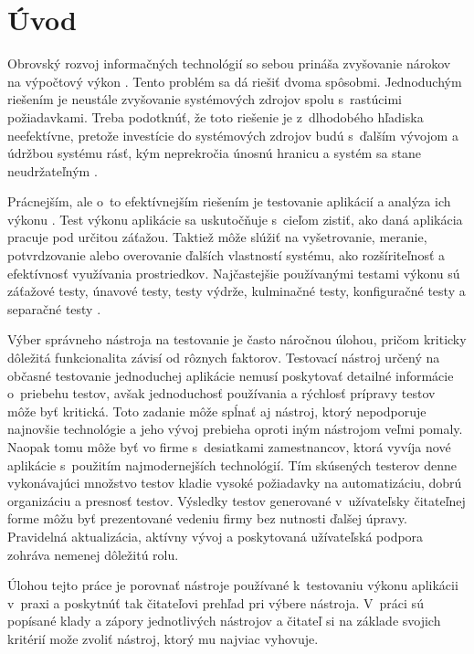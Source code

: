 \documentclass[12pt,oneside,final]{fithesis-utf8}
\begin{document}
\chapter{Úvod}
Obrovský rozvoj informačných technológií so sebou prináša zvyšovanie nárokov na
výpočtový výkon \cite{ComputingPower}. Tento problém sa dá riešiť dvoma spôsobmi. Jednoduchým riešením 
je neustále zvyšovanie systémových zdrojov spolu s~rastúcimi požiadavkami. Treba 
podotknúť, že toto riešenie je z~dlhodobého hľadiska neefektívne, pretože investície do 
systémových zdrojov budú s~ďalším vývojom a údržbou systému rásť, kým neprekročia 
únosnú hranicu a systém sa stane neudržateľným \cite{Sochor}.
\par Prácnejším, ale o~to efektívnejším 
riešením je testovanie aplikácií a analýza ich výkonu \cite{Art}. Test výkonu aplikácie sa 
uskutočňuje s~cieľom zistiť, ako daná aplikácia pracuje pod určitou záťažou. Taktiež môže 
slúžiť na vyšetrovanie, meranie, potvrdzovanie alebo overovanie ďalších vlastností systému, 
ako rozšíriteľnosť a efektívnosť využívania prostriedkov. Najčastejšie používanými testami 
výkonu sú záťažové testy, únavové testy, testy výdrže, kulminačné testy, konfiguračné testy a separačné testy \cite{Art}.
\par
Výber správneho nástroja na testovanie je často náročnou úlohou, pričom kriticky dôležitá funkcionalita závisí od rôznych faktorov. Testovací nástroj určený na občasné testovanie jednoduchej aplikácie nemusí  poskytovať detailné informácie o~priebehu testov, avšak jednoduchosť používania a rýchlosť prípravy testov môže byť kritická. Toto zadanie môže spĺnať aj nástroj, ktorý nepodporuje najnovšie technológie a jeho vývoj prebieha oproti iným nástrojom veľmi pomaly. Naopak tomu môže byť vo firme s~desiatkami zamestnancov, ktorá vyvíja nové aplikácie s~použitím najmodernejších technológií. Tím skúsených testerov denne vykonávajúci množstvo testov kladie vysoké požiadavky na automatizáciu, dobrú organizáciu a presnosť testov. Výsledky testov generované v~užívateľsky čitateľnej forme môžu byť prezentované vedeniu firmy bez nutnosti ďalšej úpravy. Pravidelná aktualizácia, aktívny vývoj a poskytovaná užívateľská podpora zohráva nemenej dôležitú rolu.
\par
Úlohou tejto práce je porovnať nástroje používané k~testovaniu výkonu aplikácii v~praxi a poskytnúť tak čitateľovi prehľad pri výbere nástroja. V~práci sú popísané klady a zápory jednotlivých nástrojov a čitateľ si na základe svojich kritérií može zvoliť nástroj, ktorý mu najviac vyhovuje.
\end{document}
